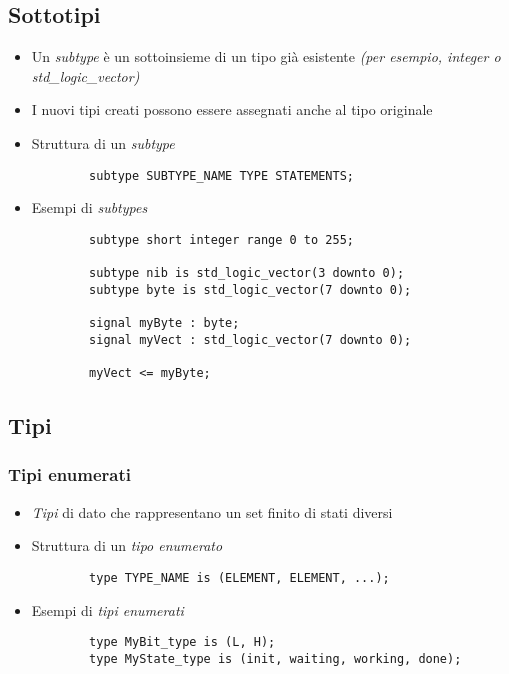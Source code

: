 \documentclass{article}
\begin{document}
\subsection{Sottotipi}
\begin{itemize}
  \item Un \textit{subtype} è un sottoinsieme di un tipo già esistente \textit{(per esempio, integer o std\_logic\_vector)}
  \item I nuovi tipi creati possono essere assegnati anche al tipo originale
  \item Struttura di un \textit{subtype}
        \begin{verbatim}
	    subtype SUBTYPE_NAME TYPE STATEMENTS;
	      \end{verbatim}
  \item Esempi di \textit{subtypes}
        \begin{verbatim}
	    subtype short integer range 0 to 255;

	    subtype nib is std_logic_vector(3 downto 0);
	    subtype byte is std_logic_vector(7 downto 0);

	    signal myByte : byte;
	    signal myVect : std_logic_vector(7 downto 0);

	    myVect <= myByte;
	      \end{verbatim}
\end{itemize}
\subsection{Tipi}
\subsubsection{Tipi enumerati}
\begin{itemize}
  \item \textit{Tipi} di dato che rappresentano un set finito di stati diversi
  \item Struttura di un \textit{tipo enumerato}
        \begin{verbatim}
	    type TYPE_NAME is (ELEMENT, ELEMENT, ...);
	      \end{verbatim}
  \item Esempi di \textit{tipi enumerati}
        \begin{verbatim}
	    type MyBit_type is (L, H);
	    type MyState_type is (init, waiting, working, done);
	      \end{verbatim}
\end{itemize}
\end{document}
